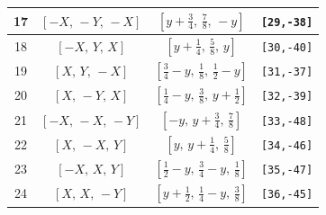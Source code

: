 \documentclass[fleqn,8pt]{jsarticle}
\begin{document}
\begin{longtable}{cccc}
17 & $\left[ - X,\, - Y,\, - X \right]$ & $\left[ y + \frac{3}{4},\, \frac{7}{8},\, - y \right]$ & {\tt [29,-38]} \\ \hline
18 & $\left[ - X,\, Y,\, X \right]$ & $\left[ y + \frac{1}{4},\, \frac{5}{8},\, y \right]$ & {\tt [30,-40]} \\ \hline
19 & $\left[ X,\, Y,\, - X \right]$ & $\left[ \frac{3}{4} - y,\, \frac{1}{8},\, \frac{1}{2} - y \right]$ & {\tt [31,-37]} \\ \hline
20 & $\left[ X,\, - Y,\, X \right]$ & $\left[ \frac{1}{4} - y,\, \frac{3}{8},\, y + \frac{1}{2} \right]$ & {\tt [32,-39]} \\ \hline
21 & $\left[ - X,\, - X,\, - Y \right]$ & $\left[ - y,\, y + \frac{3}{4},\, \frac{7}{8} \right]$ & {\tt [33,-48]} \\ \hline
22 & $\left[ X,\, - X,\, Y \right]$ & $\left[ y,\, y + \frac{1}{4},\, \frac{5}{8} \right]$ & {\tt [34,-46]} \\ \hline
23 & $\left[ - X,\, X,\, Y \right]$ & $\left[ \frac{1}{2} - y,\, \frac{3}{4} - y,\, \frac{1}{8} \right]$ & {\tt [35,-47]} \\ \hline
24 & $\left[ X,\, X,\, - Y \right]$ & $\left[ y + \frac{1}{2},\, \frac{1}{4} - y,\, \frac{3}{8} \right]$ & {\tt [36,-45]} \\
\end{longtable}
\renewcommand{\arraystretch}{1.2}
\end{document}

